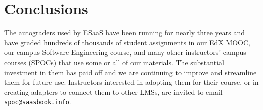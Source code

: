 \section{Conclusions}

The autograders used by ESaaS have been running for nearly three years
and have graded hundreds of thousands of student assignments in our EdX
MOOC, our campus Software Engineering course, and many other
instructors' campus courses (SPOCs) that use some or all of our materials.
The substantial investment in them has paid off and we are continuing to
improve and streamline them for future use.
Instructors interested in adopting them for their course, or in
creating adapters to connect them to other LMSs, are invited to
email \texttt{spoc@saasbook.info}.



